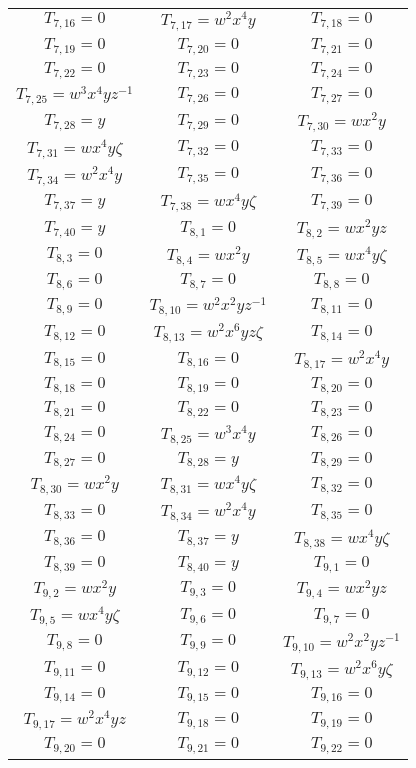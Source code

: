 \documentclass[12pt]{memoireuqam1.3}
\begin{document}
\begin{longtable}{|c|c|c|}
$T_{7,16}= 0$&
$T_{7,17}= w^2x^4y$&
$T_{7,18}= 0$\\
$T_{7,19}= 0$&
$T_{7,20}= 0$&
$T_{7,21}= 0$\\
$T_{7,22}= 0$&
$T_{7,23}= 0$&
$T_{7,24}= 0$\\
$T_{7,25}= w^3x^4yz^{-1}$&
$T_{7,26}= 0$&
$T_{7,27}= 0$\\
$T_{7,28}= y$&
$T_{7,29}= 0$&
$T_{7,30}= wx^2y$\\
$T_{7,31}= wx^4y\zeta$&
$T_{7,32}= 0$&
$T_{7,33}= 0$\\
$T_{7,34}= w^2x^4y$&
$T_{7,35}= 0$&
$T_{7,36}= 0$\\
$T_{7,37}= y$&
$T_{7,38}= wx^4y\zeta$&
$T_{7,39}= 0$\\
$T_{7,40}= y$&
$T_{8,1}= 0$&
$T_{8,2}= wx^2yz$\\
$T_{8,3}= 0$&
$T_{8,4}= wx^2y$&
$T_{8,5}= wx^4y\zeta$\\
$T_{8,6}= 0$&
$T_{8,7}= 0$&
$T_{8,8}= 0$\\
$T_{8,9}= 0$&
$T_{8,10}= w^2x^2yz^{-1}$&
$T_{8,11}= 0$\\
$T_{8,12}= 0$&
$T_{8,13}= w^2x^6yz\zeta$&
$T_{8,14}= 0$\\
$T_{8,15}= 0$&
$T_{8,16}= 0$&
$T_{8,17}= w^2x^4y$\\
$T_{8,18}= 0$&
$T_{8,19}= 0$&
$T_{8,20}= 0$\\
$T_{8,21}= 0$&
$T_{8,22}= 0$&
$T_{8,23}= 0$\\
$T_{8,24}= 0$&
$T_{8,25}= w^3x^4y$&
$T_{8,26}= 0$\\
$T_{8,27}= 0$&
$T_{8,28}= y$&
$T_{8,29}= 0$\\
$T_{8,30}= wx^2y$&
$T_{8,31}= wx^4y\zeta$&
$T_{8,32}= 0$\\
$T_{8,33}= 0$&
$T_{8,34}= w^2x^4y$&
$T_{8,35}= 0$\\
$T_{8,36}= 0$&
$T_{8,37}= y$&
$T_{8,38}= wx^4y\zeta$\\
$T_{8,39}= 0$&
$T_{8,40}= y$&
$T_{9,1}= 0$\\
$T_{9,2}= wx^2y$&
$T_{9,3}= 0$&
$T_{9,4}= wx^2yz$\\
$T_{9,5}= wx^4y\zeta$&
$T_{9,6}= 0$&
$T_{9,7}= 0$\\
$T_{9,8}= 0$&
$T_{9,9}= 0$&
$T_{9,10}= w^2x^2yz^{-1}$\\
$T_{9,11}= 0$&
$T_{9,12}= 0$&
$T_{9,13}= w^2x^6y\zeta$\\
$T_{9,14}= 0$&
$T_{9,15}= 0$&
$T_{9,16}= 0$\\
$T_{9,17}= w^2x^4yz$&
$T_{9,18}= 0$&
$T_{9,19}= 0$\\
$T_{9,20}= 0$&
$T_{9,21}= 0$&
$T_{9,22}= 0$\\

\end{longtable}
\end{document}
